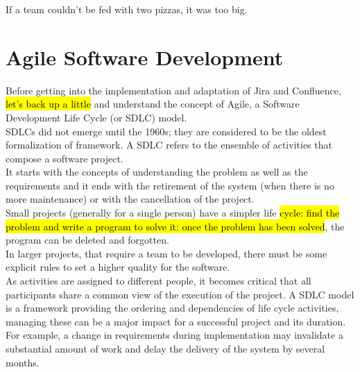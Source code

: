 \begin{savequote}[75mm]
If a team couldn’t be fed with two pizzas, it was too big.
\end{savequote}


\chapter{Agile Software Development}
\label{chapter_3}

Before getting into the implementation and adaptation of Jira and Confluence, \hl{let's back up a little} and understand the concept of Agile, a Software Development Life Cycle (or SDLC) model.\\
SDLCs did not emerge until the 1960s; they are considered to be the oldest formalization of framework.
A SDLC refers to the ensemble of activities that compose a software project.\\
It starts with the concepts of understanding the problem as well as the requirements and it ends with the retirement of the system (when there is no more maintenance) or with the cancellation of the project.\\
Small projects (generally for a single person) have a simpler life \hl{cycle: find the problem and write a program to solve it: once the problem has been solved}, the program can be deleted and forgotten.\\
In larger projects, that require a team to be developed, there must be some explicit rules to set a higher quality for the software.\\
As activities are assigned to different people, it becomes critical that all participants share a common view of the execution of the project.
A SDLC model is a framework providing the ordering and dependencies of life cycle activities, managing these can be a major impact for a successful project and its duration.\\
For example, a change in requirements during implementation may invalidate a substantial amount of work and delay the delivery of the system by several months.
